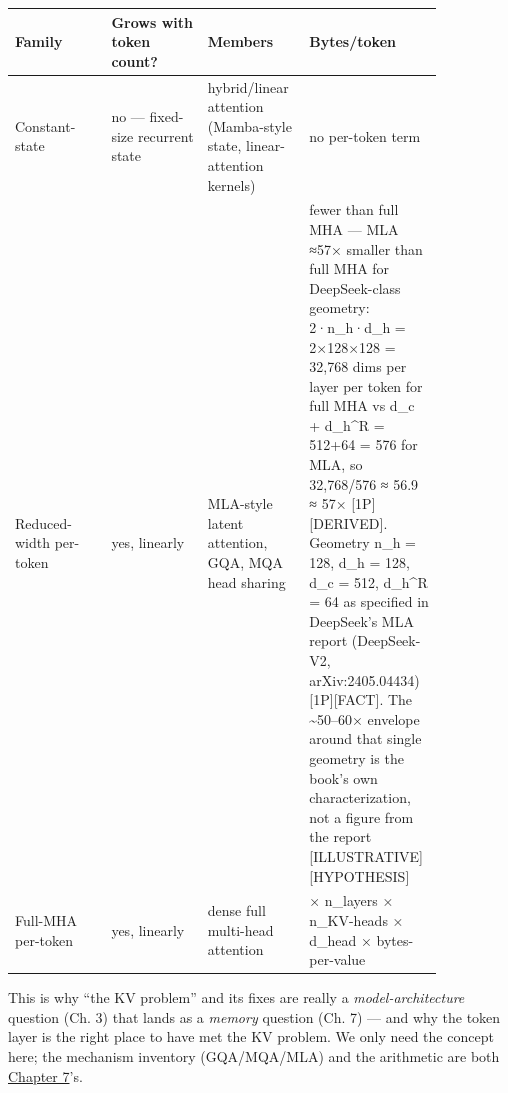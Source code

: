 \nopagebreak[4]
\begin{longtable}[]{@{}
  >{\raggedright\arraybackslash}p{0.2127\linewidth}
  >{\raggedright\arraybackslash}p{0.2127\linewidth}
  >{\raggedright\arraybackslash}p{0.2127\linewidth}
  >{\raggedright\arraybackslash}p{0.2127\linewidth}@{}}
\toprule\noalign{}
\begin{minipage}[b]{\linewidth}\raggedright
Family
\end{minipage} & \begin{minipage}[b]{\linewidth}\raggedright
Grows with token count?
\end{minipage} & \begin{minipage}[b]{\linewidth}\raggedright
Members
\end{minipage} & \begin{minipage}[b]{\linewidth}\raggedright
Bytes/token
\end{minipage} \\
\midrule\noalign{}
\endhead
\bottomrule\noalign{}
\endlastfoot
Constant-state & no --- fixed-size recurrent state & hybrid/linear
attention (Mamba-style state, linear-attention kernels) & no per-token
term \\
\noalign{\label{tab:1.2}}
Reduced-width per-token & yes, linearly & MLA-style latent attention,
GQA, MQA head sharing & fewer than full MHA --- MLA ≈57× smaller than
full MHA for DeepSeek-class geometry: 2·n\_h·d\_h = 2×128×128 = 32,768
dims per layer per token for full MHA vs d\_c + d\_h\^{}R = 512+64 = 576
for MLA, so 32,768/576 ≈ 56.9 ≈ 57× \mbox{{[}1P{]}}\hspace{0pt}\mbox{{[}DERIVED{]}}. Geometry n\_h
= 128, d\_h = 128, d\_c = 512, d\_h\^{}R = 64 as specified in DeepSeek's
MLA report (DeepSeek-V2, arXiv:2405.04434) \mbox{{[}1P{]}}\hspace{0pt}\mbox{{[}FACT{]}}. The
\textasciitilde50--60× envelope around that single geometry is the
book's own characterization, not a figure from the report
\mbox{{[}ILLUSTRATIVE{]}}\hspace{0pt}\mbox{{[}HYPOTHESIS{]}} \\
Full-MHA per-token & yes, linearly & dense full multi-head attention & 2
× n\_layers × n\_KV-heads × d\_head × bytes-per-value \\
\end{longtable}

This is why ``the KV problem'' and its fixes are really a
\emph{model-architecture} question (Ch. 3) that lands as a \emph{memory}
question (Ch. 7) --- and why the token layer is the right place to have
met the KV problem. We only need the concept here; the mechanism
inventory (GQA/MQA/MLA) and the arithmetic are both \hyperref[chap:7]{Chapter 7}'s.

